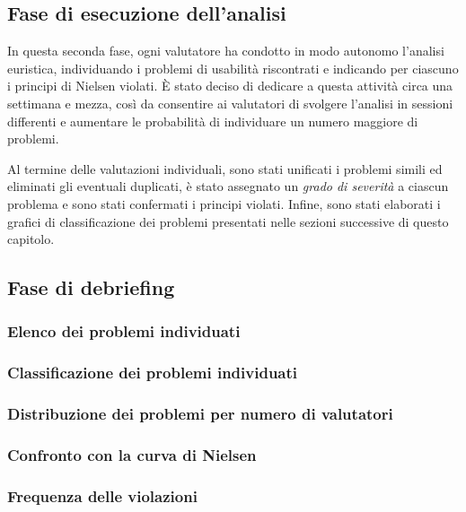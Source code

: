 \subsection{Fase di esecuzione dell'analisi}
In questa seconda fase, ogni valutatore ha condotto in modo autonomo l'analisi euristica, individuando i problemi di usabilità riscontrati e indicando per ciascuno i principi di Nielsen violati. È stato deciso di dedicare a questa attività circa una settimana e mezza, così da consentire ai valutatori di svolgere l'analisi in sessioni differenti e aumentare le probabilità di individuare un numero maggiore di problemi.

Al termine delle valutazioni individuali, sono stati unificati i problemi simili ed eliminati gli eventuali duplicati, è stato assegnato un \textit{grado di severità} a ciascun problema e sono stati confermati i principi violati. Infine, sono stati elaborati i grafici di classificazione dei problemi presentati nelle sezioni successive di questo capitolo.

\subsection{Fase di debriefing}

\subsubsection{Elenco dei problemi individuati}





\subsubsection{Classificazione dei problemi individuati}


\subsubsection{Distribuzione dei problemi per numero di valutatori}


\subsubsection{Confronto con la curva di Nielsen}


\subsubsection{Frequenza delle violazioni}

